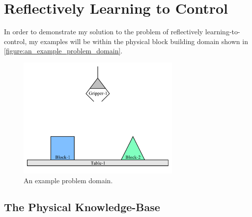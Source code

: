 \chapter{Reflectively Learning to Control}
\label{chapter:reflectively_learning_to_control}

In order to demonstrate my solution to the problem of reflectively
learning-to-control, my examples will be within the physical block
building domain shown in \autoref{figure:an_example_problem_domain}.

\begin{figure}
\begin{center}
\includegraphics[width=8cm]{gfx/blocks_world_example-1}
\end{center}
\caption[An example problem domain.]{An example problem domain.}
\label{figure:an_example_problem_domain}
\end{figure}

\section{The Physical Knowledge-Base}

